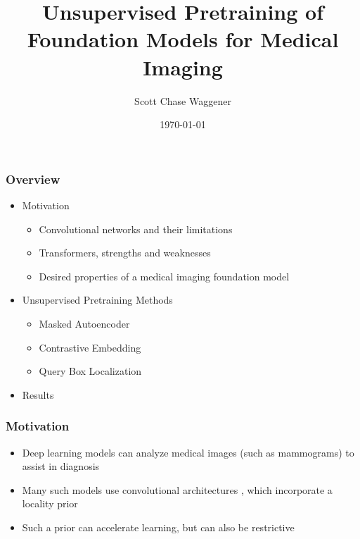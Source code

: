 \documentclass{beamer}
\title{Unsupervised Pretraining of Foundation Models for Medical Imaging}
\author{Scott Chase Waggener}
\date{\today}
\begin{document}
\frame{\titlepage}

\begin{frame}
   \frametitle{Overview}
   \begin{itemize}
        \item Motivation
        \begin{itemize}
            \item Convolutional networks and their limitations
            \item Transformers, strengths and weaknesses
            \item Desired properties of a medical imaging foundation model
        \end{itemize}
        \item Unsupervised Pretraining Methods
        \begin{itemize}
            \item Masked Autoencoder
            \item Contrastive Embedding
            \item Query Box Localization
        \end{itemize}
        \item Results
   \end{itemize}
\end{frame}


\begin{frame}
   \frametitle{Motivation}
   \begin{itemize}
        \item Deep learning models can analyze medical images (such as mammograms) to assist in diagnosis \cite{McKinney2020}
        \item Many such models use convolutional architectures \cite{COGAN201918}, which incorporate a locality prior
        \item Such a prior can accelerate learning, but can also be restrictive
   \end{itemize}
\end{frame}
\end{document}
